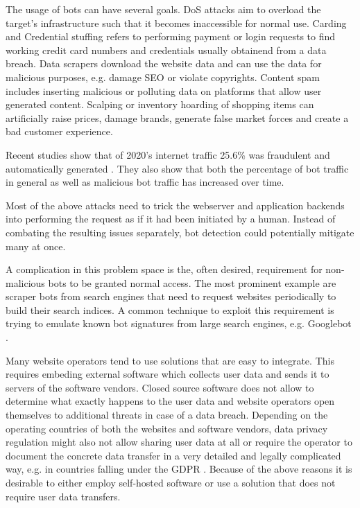 \documentclass[
    fontsize=12pt,
    headings=small,
    parskip=half,           %
    bibliography=totoc,
    numbers=noenddot,       %
    open=any,               %
    final                   %
    ]{scrreprt}
\begin{document}
The usage of bots can have several goals. DoS attacks aim to overload the target's infrastructure such that it becomes inaccessible for normal use. Carding and Credential stuffing refers to performing payment or login requests to find working credit card numbers and credentials usually obtainend from a data breach. Data scrapers download the website data and can use the data for malicious purposes, e.g. damage SEO or violate copyrights. Content spam includes inserting malicious or polluting data on platforms that allow user generated content. Scalping or inventory hoarding of shopping items can artificially raise prices, damage brands, generate false market forces and create a bad customer experience.

Recent studies show that of 2020's internet traffic 25.6\% was fraudulent and automatically generated \cite{BAD_BOT_REPORT2020} \cite{BAD_BOT_REPORT2021}. They also show that both the percentage of bot traffic in general as well as malicious bot traffic has increased over time.

Most of the above attacks need to trick the webserver and application backends into performing the request as if it had been initiated by a human. Instead of combating the resulting issues separately, bot detection could potentially mitigate many at once.

A complication in this problem space is the, often desired, requirement for non-malicious bots to be granted normal access. The most prominent example are scraper bots from search engines that need to request websites periodically to build their search indices. A common technique to exploit this requirement is trying to emulate known bot signatures from large search engines, e.g. Googlebot \cite{8421894}.

Many website operators tend to use solutions that are easy to integrate. This requires embeding external software which collects user data and sends it to servers of the software vendors. Closed source software does not allow to determine what exactly happens to the user data and website operators open themselves to additional threats in case of a data breach. Depending on the operating countries of both the websites and software vendors, data privacy regulation might also not allow sharing user data at all or require the operator to document the concrete data transfer in a very detailed and legally complicated way, e.g. in countries falling under the GDPR \cite{GDPR}. Because of the above reasons it is desirable to either employ self-hosted software or use a solution that does not require user data transfers.
\end{document}
